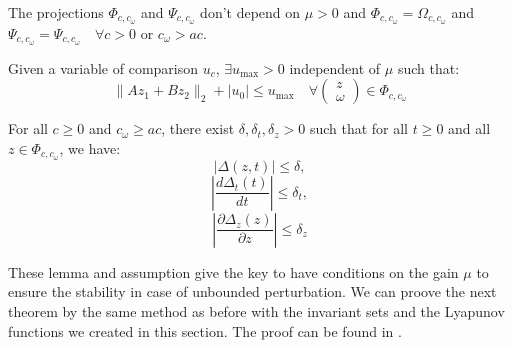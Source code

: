 \begin{lemma}
The projections \(\Phi_{c, c_\omega}\) and \(\Psi_{c, c_\omega}\) don't depend on \(\mu > 0\) and 
\(\Phi_{c, c_\omega} = \Omega_{c, c_\omega}\) and
\(\Psi_{c, c_\omega} = \Psi_{c, c_\omega} \quad \forall c > 0 \text{ or } c_\omega > a c\).
\end{lemma}

Given a variable of comparison \(u_c\), \(\exists u_{\max} > 0\) independent of \(\mu\) such that:
\begin{equation}
    \|Az_1 + Bz_2\|_2 + |u_0| \leq u_{\max} \quad \forall \begin{pmatrix} z \\ \omega \end{pmatrix} \in \Phi_{c, c_\omega}
\end{equation}

\begin{assumption}
    For all \(c \geq 0\) and \(c_\omega \geq a c\), there exist \(\delta, \delta_t, \delta_z > 0\) such that 
    for all \(t \geq 0\) and all \(z \in \Phi_{c, c_\omega}\), we have:
    \begin{equation}
        |\Delta(z, t)| \leq \delta,
    \end{equation}
    \begin{equation}
        \left| \frac{d\Delta_t(t)}{dt} \right| \leq \delta_t,
    \end{equation}
    \begin{equation}
        \left| \frac{\partial \Delta_z(z)}{\partial z} \right| \leq \delta_{z} 
    \end{equation}
\end{assumption}

These lemma and assumption give the key to have conditions on the gain \(\mu\) to ensure the stability 
in case of unbounded perturbation. We can proove the next theorem by the same method as before with the 
invariant sets and the Lyapunov functions we created in this section. The proof can be found in \cite{tietze2025dynamic}.


